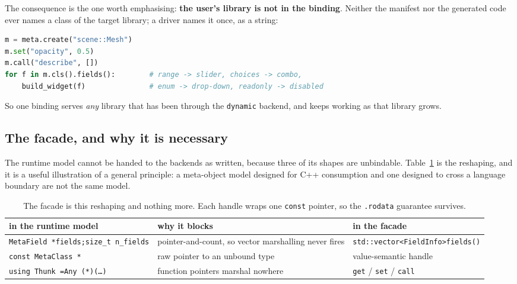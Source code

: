 \documentclass[11pt,a4paper]{article}
\newcommand{\code}[1]{\texttt{\small #1}}
\begin{document}
The consequence is the one worth emphasising: \textbf{the user's library is not
in the binding}. Neither the manifest nor the generated code ever names a class
of the target library; a driver names it once, as a string:

\begin{lstlisting}[language=Python,caption={The script names the C++ class as data. Nothing in the binding knows \code{scene::Mesh} exists.},label={lst:script}]
m = meta.create("scene::Mesh")
m.set("opacity", 0.5)
m.call("describe", [])
for f in m.cls().fields():        # range -> slider, choices -> combo,
    build_widget(f)               # enum -> drop-down, readonly -> disabled
\end{lstlisting}

So one binding serves \emph{any} library that has been through the
\code{dynamic} backend, and keeps working as that library grows.

\subsection{The facade, and why it is necessary}

The runtime model cannot be handed to the backends as written, because three of
its shapes are unbindable. Table~\ref{tab:facade} is the reshaping, and it is a
useful illustration of a general principle: a meta-object model designed for C++
consumption and one designed to cross a language boundary are not the same
model.

\begin{table}[h]
\centering\footnotesize
\begin{tabular}{@{}p{}p{}p{}@{}}
\toprule
in the runtime model & why it blocks & in the facade \\
\midrule
\code{MetaField *fields;}\newline\code{size\_t n\_fields} & pointer-and-count, so vector marshalling never fires & \code{std::vector<FieldInfo>}\newline\code{fields()} \\[2pt]
\code{const MetaClass *} & raw pointer to an unbound type & value-semantic handle \\[2pt]
\code{using Thunk =}\newline\code{Any (*)(\dots)} & function pointers marshal nowhere & \code{get} / \code{set} / \code{call} \\
\bottomrule
\end{tabular}
\caption{The facade is this reshaping and nothing more. Each handle wraps one
\code{const} pointer, so the \code{.rodata} guarantee survives.}
\label{tab:facade}
\end{table}
\end{document}
